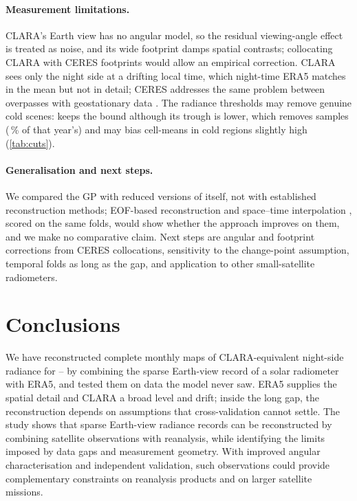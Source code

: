 \documentclass[10pt,twocolumn,a4paper]{article}
\begin{document}
\paragraph{Measurement limitations.} CLARA's Earth view has no angular model, so the residual viewing-angle effect is treated as noise, and its wide footprint damps spatial contrasts; collocating CLARA with CERES footprints \cite{pmod_clara_ceres_pipeline} would allow an empirical correction. CLARA sees only the night side at a drifting local time, which night-time ERA5 matches in the mean but not in detail; CERES addresses the same problem between overpasses with geostationary data \cite{doelling2013geo}. The radiance thresholds may remove genuine cold scenes: \lastYear{} keeps the \olrMinRaisedSecondYear{} bound although its trough is lower, which removes \nLastYearTroughToLimit{} samples (\lastYearTroughToLimitPct\,\% of that year's) and may bias \lastYear{} cell-means in cold regions slightly high (\cref{tab:cuts}).

\paragraph{Generalisation and next steps.} We compared the GP with reduced versions of itself, not with established reconstruction methods; EOF-based reconstruction \cite{beckers2003dineof} and space--time interpolation \cite{liebmann1996olr}, scored on the same folds, would show whether the approach improves on them, and we make no comparative claim. Next steps are angular and footprint corrections from CERES collocations, sensitivity to the change-point assumption, temporal folds as long as the gap, and application to other small-satellite radiometers.

\section{Conclusions}\label{sec:conclusion}
We have reconstructed complete monthly maps of CLARA-equivalent night-side radiance for \firstYear--\lastYear{} by combining the sparse Earth-view record of a solar radiometer with ERA5, and tested them on data the model never saw. ERA5 supplies the spatial detail and CLARA a broad level and drift; inside the long gap, the reconstruction depends on assumptions that cross-validation cannot settle. The study shows that sparse Earth-view radiance records can be reconstructed by combining satellite observations with reanalysis, while identifying the limits imposed by data gaps and measurement geometry. With improved angular characterisation and independent validation, such observations could provide complementary constraints on reanalysis products and on larger satellite missions.
\end{document}
